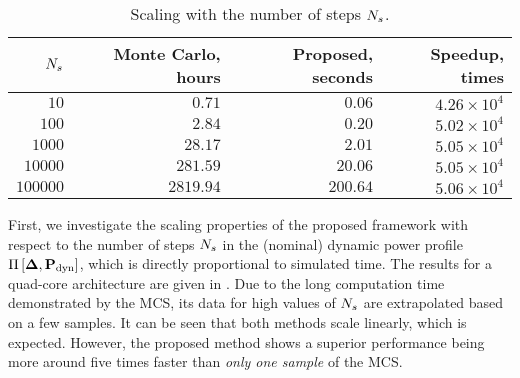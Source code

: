 \begin{table}
  \centering
  \caption{Scaling with the number of steps ${N_s}$.}
  \vspace{-10pt}
  \begin{tabular}{|r|r|r|r|}
    \hline
    ${N_s}$ & Monte Carlo, hours & Proposed, seconds & Speedup, times \\
    \hline
    $     10$ & $   0.71$ & $  0.06$ & $4.26 \times 10^4$ \\
    $    100$ & $   2.84$ & $  0.20$ & $5.02 \times 10^4$ \\
    $   1000$ & $  28.17$ & $  2.01$ & $5.05 \times 10^4$ \\
    $  10000$ & $ 281.59$ & $ 20.06$ & $5.05 \times 10^4$ \\
    $ 100000$ & $2819.94$ & $200.64$ & $5.06 \times 10^4$ \\
    \hline
  \end{tabular}
  \vspace{-10pt}
\end{table}
First, we investigate the scaling properties of the proposed framework with respect to the number of steps ${N_s}$ in the (nominal) dynamic power profile $\prof{\mP_\dyn}$, which is directly proportional to simulated time. The results for a quad-core architecture are given in . Due to the long computation time demonstrated by the MCS, its data for high values of ${N_s}$ are extrapolated based on a few samples. It can be seen that both methods scale linearly, which is expected. However, the proposed method shows a superior performance being more around five times faster than \emph{only one sample} of the MCS.

